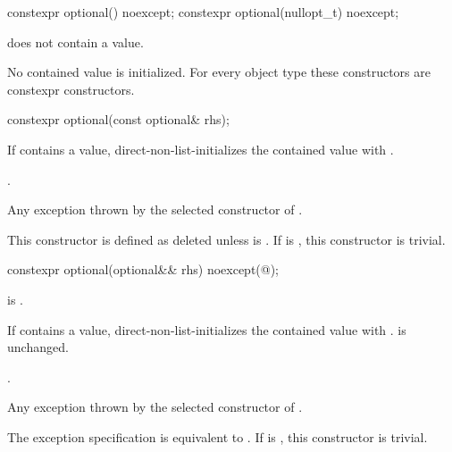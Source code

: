 %
\begin{itemdecl}
constexpr optional() noexcept;
constexpr optional(nullopt_t) noexcept;
\end{itemdecl}

\begin{itemdescr}
\pnum
\ensures
{} does not contain a value.

\pnum
\remarks
No contained value is initialized.
For every object type  these constructors are constexpr constructors.
\end{itemdescr}

%
\begin{itemdecl}
constexpr optional(const optional& rhs);
\end{itemdecl}

\begin{itemdescr}
\pnum
\effects
If  contains a value, direct-non-list-initializes the contained value
with .

\pnum
\ensures
{}.

\pnum
\throws
Any exception thrown by the selected constructor of .

\pnum
\remarks
This constructor is defined as deleted unless
 is .
If  is ,
this constructor is trivial.
\end{itemdescr}

%
\begin{itemdecl}
constexpr optional(optional&& rhs) noexcept(@\seebelow@);
\end{itemdecl}

\begin{itemdescr}
\pnum
\constraints
{} is .

\pnum
\effects
If  contains a value, direct-non-list-initializes the contained value
with .
 is unchanged.

\pnum
\ensures
{}.

\pnum
\throws
Any exception thrown by the selected constructor of .

\pnum
\remarks
The exception specification is equivalent to
.
If  is ,
this constructor is trivial.
\end{itemdescr}

